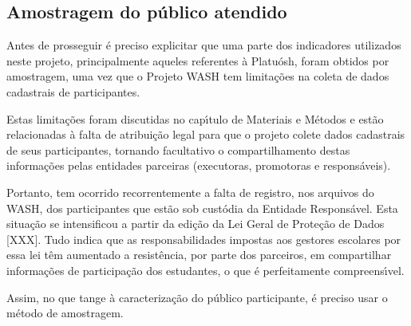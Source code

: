 \documentclass[
12pt,		%
openright,	%
twoside,  %
a4paper,			%
chapter=TITLE,		%
english,			%
french,				%
spanish,			%
brazil				%
]{USPSC-classe/USPSC}
\begin{document}
\subsection[Amostragem do p\'ublico atendido]{Amostragem do p\'ublico atendido}\label{Amostragem do p\'ublico atendido}
Antes de prosseguir \'e preciso explicitar que uma parte dos indicadores utilizados neste projeto, principalmente aqueles referentes \`a Platu\'osh, foram obtidos por amostragem, uma vez que o Projeto WASH tem limita\c{c}\~oes na coleta de dados cadastrais de participantes.














Estas limita\c{c}\~oes foram discutidas no cap\'{\i}tulo de Materiais e M\'etodos e est\~ao relacionadas \`a falta de atribui\c{c}\~ao legal para que o projeto colete dados cadastrais de seus participantes, tornando facultativo o compartilhamento destas informa\c{c}\~oes pelas entidades parceiras (executoras, promotoras e respons\'aveis).














Portanto, tem ocorrido recorrentemente a falta de registro, nos arquivos do WASH, dos participantes que est\~ao sob cust\'odia da Entidade Respons\'avel. Esta situa\c{c}\~ao se intensificou a partir da edi\c{c}\~ao da Lei Geral de Prote\c{c}\~ao de Dados [XXX]. Tudo indica que as responsabilidades impostas aos gestores escolares por essa lei t\^em aumentado a  resist\^encia, por parte dos parceiros, em compartilhar informa\c{c}\~oes de participa\c{c}\~ao dos estudantes, o que \'e perfeitamente compreens\'{\i}vel.














Assim, no que tange \`a caracteriza\c{c}\~ao do p\'ublico participante, \'e preciso usar o m\'etodo de amostragem.
\end{document}
